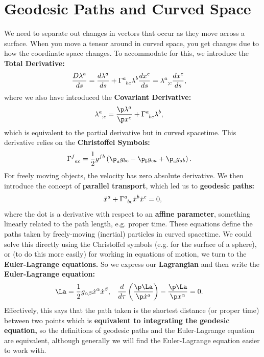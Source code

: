 \documentclass[a4paper, 11pt, normalem]{report}
\begin{document}
\section{Geodesic Paths and Curved Space}
We need to separate out changes in vectors that occur as they move across a surface.
When you move a tensor around in curved space, you get changes due to how the coordinate space changes.
To accommodate for this, we introduce the \textbf{Total Derivative:}
\begin{align}
    \frac{D\lambda^a}{ds} &= \frac{d\lambda^a}{ds} + \tensor{\Gamma}{^a_{bc}}\lambda^b\frac{dx^c}{ds} = \tensor{\lambda}{^a_{;c}}\frac{dx^c}{ds},
\end{align}
where we also have introduced the \textbf{Covariant Derivative:}
\begin{align}
    \tensor{\lambda}{^a_{;c}} &= \frac{\p\lambda^a}{\p x^c} + \tensor{\Gamma}{^a_{bc}}\lambda^b,
\end{align}
which is equivalent to the partial derivative but in curved spacetime. 
This derivative relies on the \textbf{Christoffel Symbols:}
\begin{align}
    \tensor{\Gamma}{^f_{ac}} &= \frac12 g^{fb}\left(\p_a g_{bc} - \p_b g_{ca} + \p_c g_{ab}\right).
\end{align}
For freely moving objects, the velocity has zero absolute derivative. 
We then introduce the concept of \textbf{parallel transport}, which led us to \textbf{geodesic paths:}
\begin{align}
    \ddot{x}^a + \tensor{\Gamma}{^a_{bc}}\dot{x}^b\dot{x}^c = 0,
\end{align}
where the dot is a derivative with respect to an \textbf{affine parameter}, something linearly related to the path length, e.g. proper time. 
These equations define the paths taken by freely-moving (inertial) particles in curved spacetime. 
We could solve this directly using the Christoffel symbols (e.g. for the surface of a sphere), or (to do this more easily) for working in equations of motion, we turn to the \textbf{Euler-Lagrange equations.}
So we express our \textbf{Lagrangian} and then write the \textbf{Euler-Lagrange equation:}
\begin{align}
    \La &= \frac12 g_{\alpha\beta}\dot{x}^\alpha\dot{x}^\beta, & \frac{d}{d\tau}\left(\frac{\p\La}{\p\dot{x}^a}\right) - \frac{\p\La}{\p x^\alpha} &= 0.
\end{align}
Effectively, this says that the path taken is the shortest distance (or proper time) between two points which is \textbf{equivalent to integrating the geodesic equation,} so the definitions of geodesic paths and the Euler-Lagrange equation are equivalent, although generally we will find the Euler-Lagrange equation easier to work with.
\end{document}
